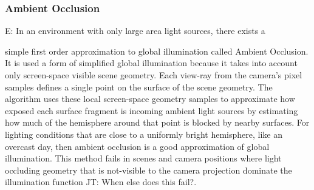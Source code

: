 \documentclass[10pt,twocolumn,letterpaper]{article}
\newcommand{\tompson}[1]{{\color{green} JT: #1}}
\newcommand{\edit}[1]{{\color{red} E: #1}}
\begin{document}
\subsubsection{Ambient Occlusion}

\edit{In an environment with only large area light sources, there exists a}

simple first order approximation to global illumination called Ambient Occlusion. It is used a form of simplified global illumination because it takes into account only screen-space visible  scene geometry\cite{Miller:1994:EAL:192161.192244}.  Each view-ray from the camera's pixel samples defines a single point on the surface of the scene geometry. The algorithm uses these local screen-space geometry samples to approximate how exposed each surface fragment is incoming ambient light sources by estimating how much of the hemisphere around that point is blocked by nearby surfaces. For lighting conditions that are close to a uniformly bright hemisphere, like an overcast day, then ambient occlusion is a good approximation of global illumination. This method fails in scenes and camera positions where light occluding geometry that is not-visible to the camera projection dominate the illumination function \tompson{When else does this fail?}.   \\%
\end{document}
